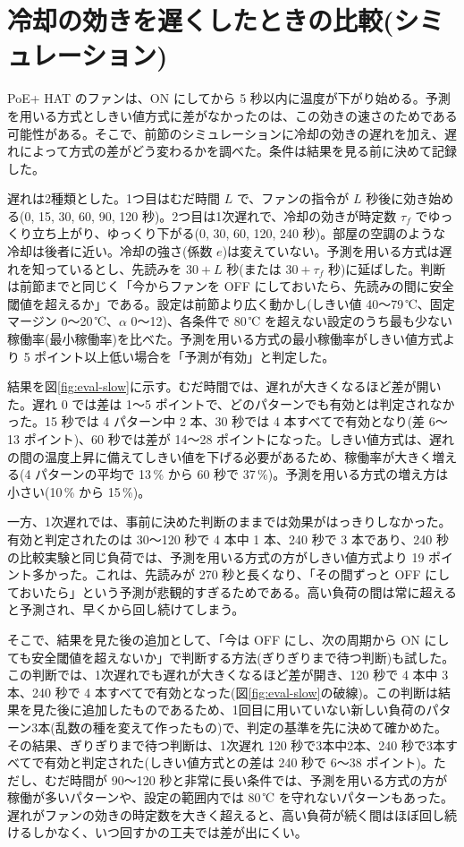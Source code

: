 \section{冷却の効きを遅くしたときの比較(シミュレーション)}\label{sec:eval-slow}
PoE+ HAT のファンは、ON にしてから 5 秒以内に温度が下がり始める。予測を用いる方式としきい値方式に差がなかったのは、この効きの速さのためである可能性がある。そこで、前節のシミュレーションに冷却の効きの遅れを加え、遅れによって方式の差がどう変わるかを調べた。条件は結果を見る前に決めて記録した。

遅れは2種類とした。1つ目はむだ時間 $L$ で、ファンの指令が $L$ 秒後に効き始める(0, 15, 30, 60, 90, 120 秒)。2つ目は1次遅れで、冷却の効きが時定数 $\tau_f$ でゆっくり立ち上がり、ゆっくり下がる(0, 30, 60, 120, 240 秒)。部屋の空調のような冷却は後者に近い。冷却の強さ(係数 $e$)は変えていない。予測を用いる方式は遅れを知っているとし、先読みを $30 + L$ 秒(または $30 + \tau_f$ 秒)に延ばした。判断は前節までと同じく「今からファンを OFF にしておいたら、先読みの間に安全閾値を超えるか」である。設定は前節より広く動かし(しきい値 40〜79\,℃、固定マージン 0〜20\,℃、$\alpha$ 0〜12)、各条件で 80\,℃ を超えない設定のうち最も少ない稼働率(最小稼働率)を比べた。予測を用いる方式の最小稼働率がしきい値方式より 5 ポイント以上低い場合を「予測が有効」と判定した。

結果を図\ref{fig:eval-slow}に示す。むだ時間では、遅れが大きくなるほど差が開いた。遅れ 0 では差は 1〜5 ポイントで、どのパターンでも有効とは判定されなかった。15 秒では 4 パターン中 2 本、30 秒では 4 本すべてで有効となり(差 6〜13 ポイント)、60 秒では差が 14〜28 ポイントになった。しきい値方式は、遅れの間の温度上昇に備えてしきい値を下げる必要があるため、稼働率が大きく増える(4 パターンの平均で 13\,\% から 60 秒で 37\,\%)。予測を用いる方式の増え方は小さい(10\,\% から 15\,\%)。

一方、1次遅れでは、事前に決めた判断のままでは効果がはっきりしなかった。有効と判定されたのは 30〜120 秒で 4 本中 1 本、240 秒で 3 本であり、240 秒の比較実験と同じ負荷では、予測を用いる方式の方がしきい値方式より 19 ポイント多かった。これは、先読みが 270 秒と長くなり、「その間ずっと OFF にしておいたら」という予測が悲観的すぎるためである。高い負荷の間は常に超えると予測され、早くから回し続けてしまう。

そこで、結果を見た後の追加として、「今は OFF にし、次の周期から ON にしても安全閾値を超えないか」で判断する方法(ぎりぎりまで待つ判断)も試した。この判断では、1次遅れでも遅れが大きくなるほど差が開き、120 秒で 4 本中 3 本、240 秒で 4 本すべてで有効となった(図\ref{fig:eval-slow}の破線)。この判断は結果を見た後に追加したものであるため、1回目に用いていない新しい負荷のパターン3本(乱数の種を変えて作ったもの)で、判定の基準を先に決めて確かめた。その結果、ぎりぎりまで待つ判断は、1次遅れ 120 秒で3本中2本、240 秒で3本すべてで有効と判定された(しきい値方式との差は 240 秒で 6〜38 ポイント)。ただし、むだ時間が 90〜120 秒と非常に長い条件では、予測を用いる方式の方が稼働が多いパターンや、設定の範囲内では 80\,℃ を守れないパターンもあった。遅れがファンの効きの時定数を大きく超えると、高い負荷が続く間はほぼ回し続けるしかなく、いつ回すかの工夫では差が出にくい。

